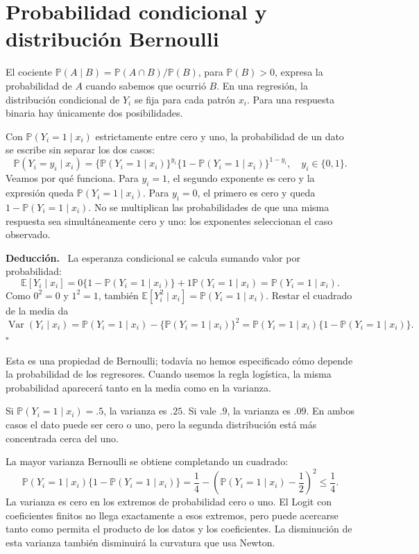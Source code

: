 \documentclass[11pt,a4paper]{article}
\newcommand{\E}{\mathbb E}
\newcommand{\Prob}{\mathbb P}
\DeclareMathOperator{\Var}{Var}
\newenvironment{deduccion}{\par\textbf{Deducción.}\ }{\hfill$\square$\par}
\begin{document}
\clearpage
\section{Probabilidad condicional y distribución Bernoulli}\label{logit2}
El cociente $\Prob(A\mid B)=\Prob(A\cap B)/\Prob(B)$, para
$\Prob(B)>0$, expresa la probabilidad de $A$ cuando sabemos que ocurrió $B$.
En una regresión, la distribución condicional de $Y_i$ se fija para cada
patrón $x_i$. Para una respuesta binaria hay únicamente dos posibilidades.

Con $\Prob(Y_i=1\mid x_i)$ estrictamente entre cero y uno,
la probabilidad de un dato se escribe sin separar los dos casos:
\[
\Prob(Y_i=y_i\mid x_i)
=\{\Prob(Y_i=1\mid x_i)\}^{y_i}
\{1-\Prob(Y_i=1\mid x_i)\}^{1-y_i},
\quad y_i\in\{0,1\}.
\]
Veamos por qué funciona. Para $y_i=1$, el segundo exponente es cero y
la expresión queda $\Prob(Y_i=1\mid x_i)$. Para $y_i=0$, el primero
es cero y queda $1-\Prob(Y_i=1\mid x_i)$.
No se multiplican las probabilidades de que una misma respuesta sea
simultáneamente cero y uno: los exponentes seleccionan el caso observado.

\begin{deduccion}
La esperanza condicional se calcula sumando valor por probabilidad:
\[
\E[Y_i\mid x_i]
=0\{1-\Prob(Y_i=1\mid x_i)\}
+1\Prob(Y_i=1\mid x_i)=\Prob(Y_i=1\mid x_i).
\]
Como $0^2=0$ y $1^2=1$, también
$\E[Y_i^2\mid x_i]=\Prob(Y_i=1\mid x_i)$. Restar el cuadrado de la media da
\[
\Var(Y_i\mid x_i)
=\Prob(Y_i=1\mid x_i)-\{\Prob(Y_i=1\mid x_i)\}^2
=\Prob(Y_i=1\mid x_i)\{1-\Prob(Y_i=1\mid x_i)\}.
\]
\end{deduccion}
Esta es una propiedad de Bernoulli; todavía no hemos especificado cómo
depende la probabilidad de los regresores. Cuando usemos la regla logística,
la misma probabilidad aparecerá tanto en la media como en la varianza.

\begin{ejemplo}
Si $\Prob(Y_i=1\mid x_i)=.5$, la varianza es $.25$.
Si vale $.9$, la varianza es $.09$.
En ambos casos el dato puede ser cero o uno, pero la segunda distribución
está más concentrada cerca del uno.
\end{ejemplo}
La mayor varianza Bernoulli se obtiene completando un cuadrado:
\[
\Prob(Y_i=1\mid x_i)\{1-\Prob(Y_i=1\mid x_i)\}
=\frac14-\left(\Prob(Y_i=1\mid x_i)-\frac12\right)^2\le\frac14.
\]
La varianza es cero en los extremos de probabilidad cero o uno.
El Logit con coeficientes finitos no llega exactamente a esos extremos,
pero puede acercarse tanto como permita el producto de los datos
y los coeficientes. La disminución de esta varianza también disminuirá
la curvatura que usa Newton.
\end{document}
